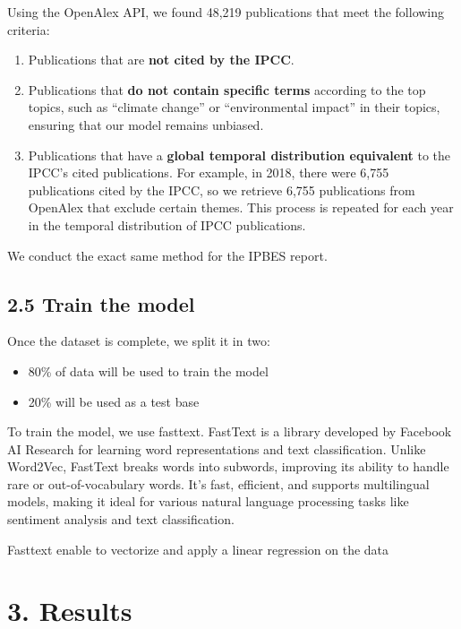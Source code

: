 \documentclass[
]{article}
\providecommand{\tightlist}{%
  \setlength{\itemsep}{0pt}\setlength{\parskip}{0pt}}
\begin{document}
Using the OpenAlex API, we found 48,219 publications that meet the
following criteria:

\begin{enumerate}
\def\labelenumi{\arabic{enumi}.}
\tightlist
\item
  Publications that are \textbf{not cited by the IPCC}.
\item
  Publications that \textbf{do not contain specific terms} according to
  the top topics, such as ``climate change'' or ``environmental impact''
  in their topics, ensuring that our model remains unbiased.
\item
  Publications that have a \textbf{global temporal distribution
  equivalent} to the IPCC's cited publications. For example, in 2018,
  there were 6,755 publications cited by the IPCC, so we retrieve 6,755
  publications from OpenAlex that exclude certain themes. This process
  is repeated for each year in the temporal distribution of IPCC
  publications.
\end{enumerate}

We conduct the exact same method for the IPBES report.

\hypertarget{train-the-model}{%
\subsection{2.5 Train the model}\label{train-the-model}}

Once the dataset is complete, we split it in two:

\begin{itemize}
\tightlist
\item
  80\% of data will be used to train the model
\item
  20\% will be used as a test base
\end{itemize}

To train the model, we use fasttext. FastText is a library developed by
Facebook AI Research for learning word representations and text
classification. Unlike Word2Vec, FastText breaks words into subwords,
improving its ability to handle rare or out-of-vocabulary words. It's
fast, efficient, and supports multilingual models, making it ideal for
various natural language processing tasks like sentiment analysis and
text classification.

Fasttext enable to vectorize and apply a linear regression on the data

\hypertarget{results}{%
\section{3. Results}\label{results}}
\end{document}
